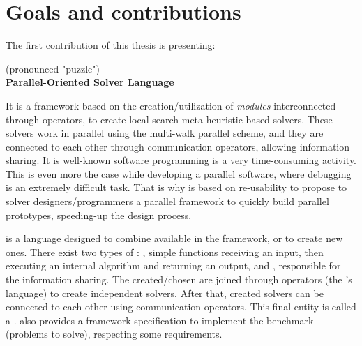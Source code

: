 \section{Goals and contributions}

The \underline{first contribution} of this thesis is presenting: 
\begin{center}
\posl{} (pronounced "puzzle")\\
\textbf{Parallel-Oriented Solver Language}
\end{center}
It is a framework based on the creation/utilization of \textit{modules} interconnected through operators, to create local-search meta-heuristic-based solvers. These solvers work in parallel using the multi-walk parallel scheme, and they are connected to each other through communication operators, allowing information sharing. It is well-known software programming is a very time-consuming activity. This is even more the case while developing a parallel software, where debugging is an extremely difficult task. That is why \posl{} is based on re-usability to propose to \csp{} solver designers/programmers a parallel framework to quickly build parallel prototypes, speeding-up the design process.

\posl{} is a language designed to combine \ms{} available in the framework, or to create new ones. There exist two types of \ms{}: \oms{}, simple functions receiving an input, then executing an internal algorithm and returning an output, and \opchs{}, responsible for the information sharing.
The created/chosen \ms{} are joined through operators (the \posl's language) to create independent solvers. After that, created solvers can be connected to each other using communication operators. This final entity is called a \soset. \posl{} also provides a framework specification to implement the benchmark (problems to solve), respecting some requirements.


